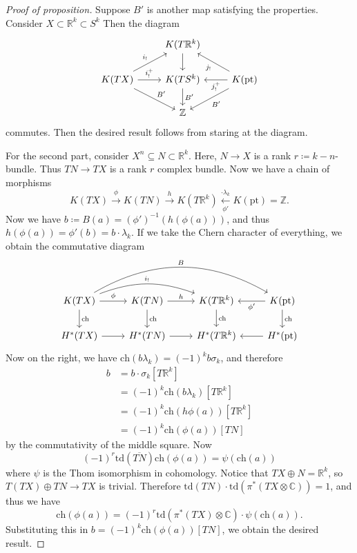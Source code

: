 \documentclass[leqno, openany]{memoir}
\theoremstyle{definition}
\theoremstyle{remark}
\theoremstyle{plain}
\theoremstyle{definition}
\theoremstyle{remark}
\newcommand{\R}{\mathbb{R}}
\newcommand{\C}{\mathbb{C}}
\newcommand{\Z}{\mathbb{Z}}
\newcommand{\mr}[1]{\mathrm{#1}}
\newcommand{\ol}[1]{\overline{#1}}
\begin{document}
\begin{proof}[Proof of proposition] Suppose $B'$ is another map satisfying the
    properties. Consider $X \subset \R^k \subset S^k$ Then the diagram
    \begin{equation*} \begin{tikzcd} & K(T\R^k) \ar{d} \\ K(TX) \ar{r}{i_!^{+}}
        \ar{dr}{B'} \ar{ur}{i_!} & K(TS^k) \ar{d}{B'} & K(\mr{pt}) \ar{dl}{B'}
        \ar{ul}{j_!} \ar{l}{j^+_!} \\ & \Z \end{tikzcd} \end{equation*}
        commutes. Then the desired result follows from staring at the diagram.

    For the second part, consider $X^n \subseteq N \subset \R^k$. Here, $N \to
    X$ is a rank $r \coloneqq k-n$-bundle. Thus $TN \to TX$ is a rank $r$
    complex bundle. Now we have a chain of morphisms \[ K(TX)
    \xrightarrow{\phi} K(TN) \xrightarrow{h} K(T\R^k)
\xleftarrow[{\phi'}]{\cdot \lambda_k} K(\mr{pt}) = \Z. \] Now we have $b
\coloneqq B(a) = {(\phi')}^{-1}(h(\phi(a)))$, and thus $h(\phi(a)) = \phi'(b) =
b \cdot \lambda_k$. If we take the Chern character of everything, we obtain the
commutative diagram \begin{equation*} \begin{tikzcd} K(TX) \ar{r}{\phi}
    \ar{d}{\mr{ch}} \ar[bend left=20]{rr}{i_!} \ar[bend left=30]{rrr}{B} &
    K(TN) \ar{r}{h} \ar{d}{\mr{ch}} & K(T\R^k) \ar{d}{\mr{ch}} & K(\mr{pt})
    \ar{d}{\mr{ch}} \ar{l}{\phi'} \\ H^*(TX) \ar{r} & H^*(TN) \ar{r} &
    H^*(T\R^k) & H^*(\mr{pt}) \ar{l} \end{tikzcd} \end{equation*} Now on the
    right, we have $\mr{ch}(b \lambda_k) = {(-1)}^k b \sigma_k$, and therefore
    \begin{align*} b &= b \cdot \sigma_k [T\R^k] \\ &= {(-1)}^k \mr{ch}(b
        \lambda_k) [T\R^k] \\ &= {(-1)}^k \mr{ch}(h \phi(a)) [T\R^k] \\ &=
        {(-1)}^k \mr{ch}(\phi(a)) [TN] \end{align*} by the commutativity of the
        middle square. Now \[ {(-1)}^r \mr{td}(\ol{TN}) \mr{ch}(\phi(a)) =
        \psi(\mr{ch}(a)) \] where $\psi$ is the Thom isomorphism in cohomology.
        Notice that $TX \oplus N = \R^k$, so $T(TX) \oplus TN \to TX$ is
        trivial. Therefore $\mr{td}(TN) \cdot \mr{td}(\pi^*(TX \otimes \C)) =
        1$, and thus we have \[ \mr{ch}(\phi(a)) = {(-1)}^r \mr{td}(\pi^*(TX)
        \otimes \C) \cdot \psi(\mr{ch}(a)). \] Substituting this in $b =
    {(-1)}^k \mr{ch}(\phi(a)) [TN]$, we obtain the desired result.  \end{proof}
\end{document}
